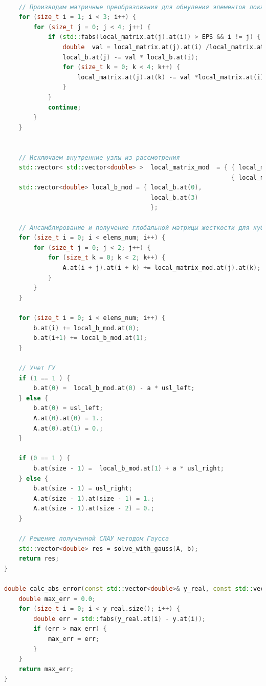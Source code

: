 \begin{lstlisting}[language=c++, label=prog,caption={\textit{Реализация МКЭ}}]
    
    // Производим матричные преобразования для обнуления элементов локальной матрицы жесткости, относящихся к внутренним узлам
    for (size_t i = 1; i < 3; i++) {
        for (size_t j = 0; j < 4; j++) {
            if (std::fabs(local_matrix.at(j).at(i)) > EPS && i != j) {
                double  val = local_matrix.at(j).at(i) /local_matrix.at(i).at(i);
                local_b.at(j) -= val * local_b.at(i);
                for (size_t k = 0; k < 4; k++) {
                    local_matrix.at(j).at(k) -= val *local_matrix.at(i).at(k);
                }
            }
            continue;
        }
    }
    
    
    // Исключаем внутренние узлы из рассмотрения
    std::vector< std::vector<double> >  local_matrix_mod  = { { local_matrix.at(0).at(0), local_matrix.at(0).at(3) },
                                                              { local_matrix.at(3).at(0), local_matrix.at(3).at(3) } };
    std::vector<double> local_b_mod = { local_b.at(0), 
                                        local_b.at(3)
                                        };
    
    // Ансамблирование и получение глобальной матрицы жесткости для кубического КЭ
    for (size_t i = 0; i < elems_num; i++) {
        for (size_t j = 0; j < 2; j++) {
            for (size_t k = 0; k < 2; k++) {
                A.at(i + j).at(i + k) += local_matrix_mod.at(j).at(k);
            }
        }
    }

    for (size_t i = 0; i < elems_num; i++) {
        b.at(i) += local_b_mod.at(0);
        b.at(i+1) += local_b_mod.at(1);
    }
       
    // Учет ГУ
    if (1 == 1 ) {
        b.at(0) =  local_b_mod.at(0) - a * usl_left;
    } else {
        b.at(0) = usl_left;
        A.at(0).at(0) = 1.;
        A.at(0).at(1) = 0.;
    }

    if (0 == 1 ) {
        b.at(size - 1) =  local_b_mod.at(1) + a * usl_right;
    } else {
        b.at(size - 1) = usl_right;
        A.at(size - 1).at(size - 1) = 1.;
        A.at(size - 1).at(size - 2) = 0.;
    }
    
    // Решение полученной СЛАУ методом Гаусса
    std::vector<double> res = solve_with_gauss(A, b);
    return res;
}

double calc_abs_error(const std::vector<double>& y_real, const std::vector<double>& y) {
    double max_err = 0.0;
    for (size_t i = 0; i < y_real.size(); i++) {
        double err = std::fabs(y_real.at(i) - y.at(i));
        if (err > max_err) {
            max_err = err;
        }
    }
    return max_err;
}


\end{lstlisting}
